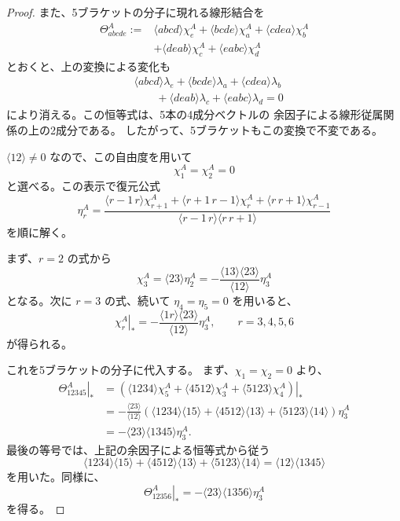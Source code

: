 \documentclass[uplatex,dvipdfmx,a4paper,11pt]{jsarticle}
\renewcommand{\proofname}{Proof}
\newenvironment{myproof}[1][\proofname]
  {\begin{proof}[#1]}
  {\end{proof}}
\numberwithin{equation}{section}
\begin{document}
\begin{myproof}
  また、5ブラケットの分子に現れる線形結合を
  \[
    \begin{aligned}
      \Theta_{abcde}^A
      :={}&
      \langle abcd\rangle\chi_e^A
      +\langle bcde\rangle\chi_a^A
      +\langle cdea\rangle\chi_b^A\\
      &+\langle deab\rangle\chi_c^A
      +\langle eabc\rangle\chi_d^A
    \end{aligned}
  \]
  とおくと、上の変換による変化も
  \[
    \begin{aligned}
      &\langle abcd\rangle\lambda_e
      +\langle bcde\rangle\lambda_a
      +\langle cdea\rangle\lambda_b\\
      &\qquad
      +\langle deab\rangle\lambda_c
      +\langle eabc\rangle\lambda_d=0
    \end{aligned}
  \]
  により消える。この恒等式は、5本の4成分ベクトルの
  余因子による線形従属関係の上の2成分である。
  したがって、5ブラケットもこの変換で不変である。

  $\langle12\rangle\neq0$ なので、この自由度を用いて
  \[
    \chi_1^A=\chi_2^A=0
  \]
  と選べる。この表示で復元公式
  \[
    \eta_r^A
      =
      \frac{
        \langle r-1\,r\rangle\chi_{r+1}^A
        +\langle r+1\,r-1\rangle\chi_r^A
        +\langle r\,r+1\rangle\chi_{r-1}^A
      }{
        \langle r-1\,r\rangle\langle r\,r+1\rangle
      }
  \]
  を順に解く。

  まず、$r=2$ の式から
  \[
    \chi_3^A
      =\langle23\rangle\eta_2^A
      =-\frac{
        \langle13\rangle\langle23\rangle
      }{\langle12\rangle}\eta_3^A
  \]
  となる。次に $r=3$ の式、続いて
  $\eta_4=\eta_5=0$ を用いると、
  \[
    \left.\chi_r^A\right|_*
      =
      -\frac{
        \langle1r\rangle\langle23\rangle
      }{\langle12\rangle}\eta_3^A,
    \qquad r=3,4,5,6
  \]
  が得られる。

  これを5ブラケットの分子に代入する。
  まず、$\chi_1=\chi_2=0$ より、
  \[
    \begin{aligned}
      \left.\Theta_{12345}^A\right|_*
      &=
      \left.
      \left(
        \langle1234\rangle\chi_5^A
        +\langle4512\rangle\chi_3^A
        +\langle5123\rangle\chi_4^A
      \right)\right|_*\\
      &=
      -\frac{\langle23\rangle}{\langle12\rangle}
      \left(
        \langle1234\rangle\langle15\rangle
        +\langle4512\rangle\langle13\rangle
        +\langle5123\rangle\langle14\rangle
      \right)\eta_3^A\\
      &=
      -\langle23\rangle\langle1345\rangle\eta_3^A.
    \end{aligned}
  \]
  最後の等号では、上記の余因子による恒等式から従う
  \[
    \langle1234\rangle\langle15\rangle
    +\langle4512\rangle\langle13\rangle
    +\langle5123\rangle\langle14\rangle
      =
      \langle12\rangle\langle1345\rangle
  \]
  を用いた。同様に、
  \[
    \left.\Theta_{12356}^A\right|_*
      =
      -\langle23\rangle\langle1356\rangle\eta_3^A
  \]
  を得る。


\end{myproof}
\end{document}
